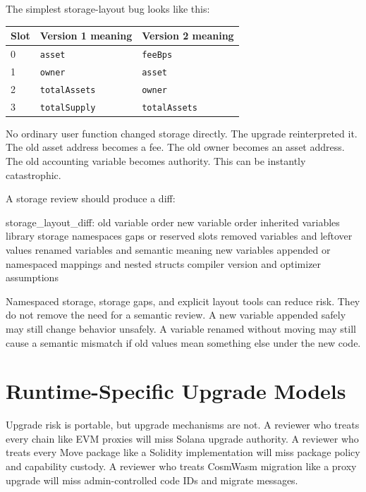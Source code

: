 The simplest storage-layout bug looks like this:

\begin{center}
\begin{tabular}{@{}lll@{}}
\toprule
Slot & Version 1 meaning & Version 2 meaning \\
\midrule
0 & \texttt{asset} & \texttt{feeBps} \\
1 & \texttt{owner} & \texttt{asset} \\
2 & \texttt{totalAssets} & \texttt{owner} \\
3 & \texttt{totalSupply} & \texttt{totalAssets} \\
\bottomrule
\end{tabular}
\end{center}

No ordinary user function changed storage directly. The upgrade reinterpreted it. The old asset address becomes a fee. The old owner becomes an asset address. The old accounting variable becomes authority. This can be instantly catastrophic.

A storage review should produce a diff:

\begin{codeblock}
storage_layout_diff:
    old variable order
    new variable order
    inherited variables
    library storage namespaces
    gaps or reserved slots
    removed variables and leftover values
    renamed variables and semantic meaning
    new variables appended or namespaced
    mappings and nested structs
    compiler version and optimizer assumptions
\end{codeblock}

Namespaced storage, storage gaps, and explicit layout tools can reduce risk. They do not remove the need for a semantic review. A new variable appended safely may still change behavior unsafely. A variable renamed without moving may still cause a semantic mismatch if old values mean something else under the new code.

\section{Runtime-Specific Upgrade Models}

Upgrade risk is portable, but upgrade mechanisms are not. A reviewer who treats every chain like EVM proxies will miss Solana upgrade authority. A reviewer who treats every Move package like a Solidity implementation will miss package policy and capability custody. A reviewer who treats CosmWasm migration like a proxy upgrade will miss admin-controlled code IDs and migrate messages.

